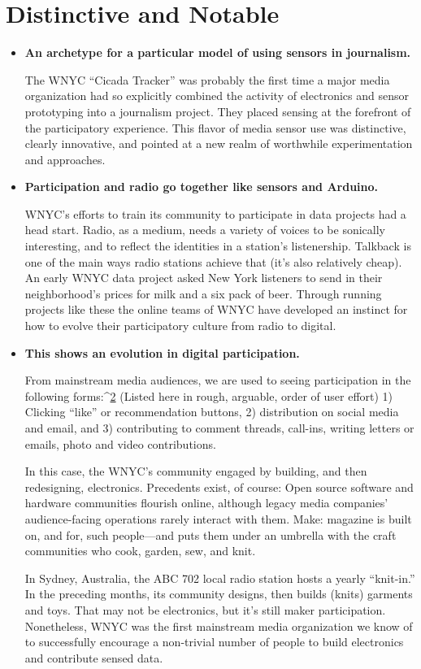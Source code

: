 \section{Distinctive and Notable}
\begin{itemize}
\item \textbf{An archetype for a particular model of using sensors
in journalism.}

The WNYC ``Cicada Tracker'' was probably the first time a major
media organization had so explicitly combined the activity of electronics
and sensor prototyping into a journalism project. They placed
sensing at the forefront of the participatory experience. This flavor of
media sensor use was distinctive, clearly innovative, and pointed at a
new realm of worthwhile experimentation and approaches.
\item \textbf{Participation and radio go together like sensors and Arduino.}

WNYC's efforts to train its community to participate in data projects
had a head start. Radio, as a medium, needs a variety of voices to be
sonically interesting, and to reflect the identities in a station's listenership.
Talkback is one of the main ways radio stations achieve that (it's
also relatively cheap). An early WNYC data project asked New York
listeners to send in their neighborhood's prices for milk and a six
pack of beer. Through running projects like these the online teams of
WNYC have developed an instinct for how to evolve their participatory
culture from radio to digital.
\item \textbf{This shows an evolution in digital participation.}

From mainstream media audiences, we are used to seeing participation
in the following forms:^{\href{#endnotes-wnyc}{2}} (Listed here in rough, arguable, order of
user effort) 1) Clicking ``like'' or recommendation buttons, 2) distribution
on social media and email, and 3) contributing to comment
threads, call-ins, writing letters or emails, photo and video contributions.

In this case, the WNYC's community engaged by building, and
then redesigning, electronics. Precedents exist, of course: Open
source software and hardware communities flourish online, although
legacy media companies' audience-facing operations rarely interact
with them. Make: magazine is built on, and for, such people—and
puts them under an umbrella with the craft communities who cook,
garden, sew, and knit.

In Sydney, Australia, the ABC 702 local radio station hosts a yearly
``knit-in.'' In the preceding months, its community designs, then builds
(knits) garments and toys. That may not be electronics, but it's still
maker participation. Nonetheless, WNYC was the first mainstream
media organization we know of to successfully encourage a non-trivial
number of people to build electronics and contribute sensed data.


\end{itemize}
